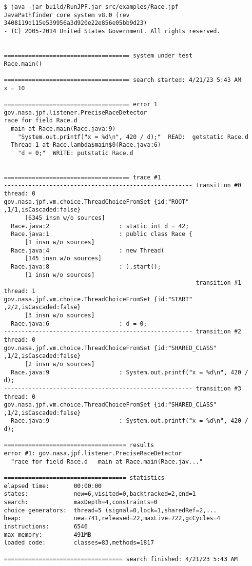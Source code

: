 \documentclass{article}
\begin{document}
\begin{pptWide}{2}
{\fontsize{10}{10}\selectfont\begin{verbatim}
$ java -jar build/RunJPF.jar src/examples/Race.jpf
JavaPathfinder core system v8.0 (rev 3408119d115e539956a3d920e22e856e05bb9d23)
- (C) 2005-2014 United States Government. All rights reserved.


==================================== system under test
Race.main()

==================================== search started: 4/21/23 5:43 AM
x = 10

==================================== error 1
gov.nasa.jpf.listener.PreciseRaceDetector
race for field Race.d
  main at Race.main(Race.java:9)
    "System.out.printf("x = %d\n", 420 / d);"  READ:  getstatic Race.d
  Thread-1 at Race.lambda$main$0(Race.java:6)
    "d = 0;"  WRITE: putstatic Race.d


==================================== trace #1
------------------------------------------------------ transition #0 thread: 0
gov.nasa.jpf.vm.choice.ThreadChoiceFromSet {id:"ROOT" ,1/1,isCascaded:false}
      [6345 insn w/o sources]
  Race.java:2                    : static int d = 42;
  Race.java:1                    : public class Race {
      [1 insn w/o sources]
  Race.java:4                    : new Thread(
      [145 insn w/o sources]
  Race.java:8                    : ).start();
      [1 insn w/o sources]
------------------------------------------------------ transition #1 thread: 1
gov.nasa.jpf.vm.choice.ThreadChoiceFromSet {id:"START" ,2/2,isCascaded:false}
      [3 insn w/o sources]
  Race.java:6                    : d = 0;
------------------------------------------------------ transition #2 thread: 0
gov.nasa.jpf.vm.choice.ThreadChoiceFromSet {id:"SHARED_CLASS" ,1/2,isCascaded:false}
      [2 insn w/o sources]
  Race.java:9                    : System.out.printf("x = %d\n", 420 / d);
------------------------------------------------------ transition #3 thread: 0
gov.nasa.jpf.vm.choice.ThreadChoiceFromSet {id:"SHARED_CLASS" ,1/2,isCascaded:false}
  Race.java:9                    : System.out.printf("x = %d\n", 420 / d);

=================================== results
error #1: gov.nasa.jpf.listener.PreciseRaceDetector
  "race for field Race.d   main at Race.main(Race.jav..."

=================================== statistics
elapsed time:       00:00:00
states:             new=6,visited=0,backtracked=2,end=1
search:             maxDepth=4,constraints=0
choice generators:  thread=5 (signal=0,lock=1,sharedRef=2,...
heap:               new=741,released=22,maxLive=722,gcCycles=4
instructions:       6546
max memory:         491MB
loaded code:        classes=83,methods=1817

================================== search finished: 4/21/23 5:43 AM
\end{verbatim}
}
\end{pptWide}
\end{document}
